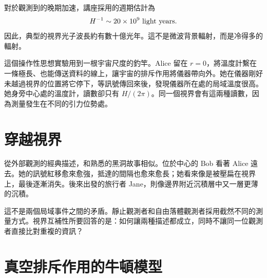 
對於觀測到的晚期加速，講座採用的週期估計為
\begin{equation}
H^{-1}\sim 20\times10^9\ {\rm light\ years}.
\label{eq:l09-lecture-horizon-estimate}
\end{equation}
因此，典型的視界光子波長約有數十億光年。這不是微波背景輻射，而是冷得多的輻射。

這個操作性思想實驗用到一根宇宙尺度的釣竿。Alice 留在 \(r=0\)，將溫度計繫在一條極長、也能傳送資料的線上，讓宇宙的排斥作用將儀器帶向外。她在儀器剛好未越過視界的位置將它停下，等訊號傳回來後，發現儀器所在處的局域溫度很高。她身旁中心處的溫度計，讀數卻只有 \(H/(2\pi)\)。同一個視界會有這兩種讀數，因為測量發生在不同的引力位勢處。

\section{穿越視界}

從外部觀測的經典描述，和熟悉的黑洞故事相似。位於中心的 Bob 看著 Alice 遠去。她的訊號紅移愈來愈強，抵達的間隔也愈來愈長；她看來像是被壓扁在視界上，最後逐漸消失。後來出發的旅行者 Jane，則像邊界附近沉積層中又一層更薄的沉積。

\begin{classroomqa}
\end{classroomqa}

\begin{classroomqa}
\end{classroomqa}

這不是兩個局域事件之間的矛盾。靜止觀測者和自由落體觀測者採用截然不同的測量方式。視界互補性所要回答的是：如何讓兩種描述都成立，同時不讓同一位觀測者直接比對重複的資訊？

\section{真空排斥作用的牛頓模型}

